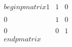 \documentclass[preview]{standalone}
\begin{document}
\begin{align*}
\quad\\begin{pmatrix} 1 & 1 & 0 \quad\\\quad\\ 0 & 1 & 0 \quad\\\quad\\ 0 & 0 & 1 \quad\\end{pmatrix}
\end{align*}
\end{document}
